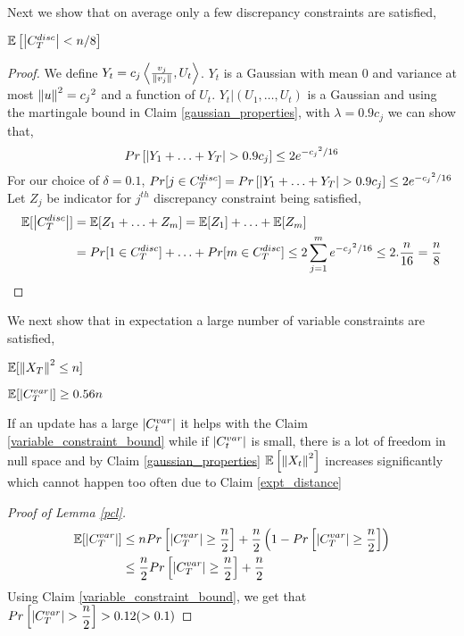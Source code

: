 Next we show that on average only a few discrepancy constraints are satisfied,
\begin{Claim}
$\mathbb{E}\left[\left\lvert C_T^{disc} \right\rvert < n/8 \right]$
\end{Claim}
\begin{proof}
We define $Y_t = c_j\left\langle \frac{v_j}{\left\lVert v_j \right\rVert},U_t\right\rangle$. $Y_t$ is a Gaussian with mean 0 and variance at most $\left\lVert u \right\rVert^2 = {c_j}^2$ and a function of $U_t$.
$Y_t|(U_1,\hdots,U_t)$ is a Gaussian and using the martingale bound in Claim \ref{gaussian_properties},  with $\lambda = 0.9c_j$ we can show that,
\[Pr\left[ \left\lvert Y_1+\hdots+Y_T \right\rvert > 0.9c_j \right] \leq 2e^{{-c_j}^2/16}\]
For our choice of $\delta = 0.1$, $Pr[j \in C_T^{disc}] = Pr\left[ \left\lvert Y_1+\hdots+Y_T \right\rvert > 0.9c_j \right] \leq 2e^{{-c_j}^2/16}$
Let $Z_j$ be indicator for $j^{th}$ discrepancy constraint being satisfied,
\begin{align*}
    \mathbb{E}[\left\lvert C_T^{disc} \right\rvert] 
    &= \mathbb{E}[Z_1+\hdots+Z_m]
    = \mathbb{E}[Z_1] + \hdots + \mathbb{E}[Z_m]\\
    &= Pr[1 \in C_T^{disc}] + \hdots + Pr[m \in C_T^{disc}]
    \leq 2\sum_{j=1}^{m}{e^{{-c_j}^2/16}} \leq 2.\dfrac{n}{16} = \dfrac{n}{8}
\end{align*}
\end{proof}
We next show that in expectation a large number of variable constraints are satisfied,
\begin{Claim} \label{expt_distance}
$\mathbb{E}[\left\lVert X_T \right\rVert^2 \leq n]$
\end{Claim}
\begin{Claim} \label{variable_constraint_bound}
$\mathbb{E}[\left\lvert C_T^{var} \right\rvert] \geq 0.56n$
\end{Claim}
If an update has a large $\left\lvert C_t^{var} \right\rvert$ it helps with the Claim \ref{variable_constraint_bound} while if $\left\lvert C_t^{var} \right\rvert$ is small, there is a lot of freedom in null space and by Claim \ref{gaussian_properties} $\operatorname{\mathbb{E}}\left[\left\lVert X_t \right\rVert^2\right]$ increases significantly which cannot happen too often due to Claim \ref{expt_distance}
\begin{proof}[Proof of Lemma \ref{pcl}]
\begin{align*}
  \mathbb{E}[\left\lvert C_T^{var} \right\rvert] 
&\leq nPr\left[\left\lvert C_T^{var} \right\rvert \geq \dfrac{n}{2}\right] + \dfrac{n}{2}\left(1- Pr\left[\left\lvert C_T^{var} \right\rvert \geq \dfrac{n}{2}\right] \right )\\
&\leq \dfrac{n}{2}Pr\left[\left\lvert C_T^{var} \right\rvert \geq \dfrac{n}{2}\right]  + \dfrac{n}{2}
\end{align*}
Using Claim \ref{variable_constraint_bound}, we get that $Pr\left[\left\lvert C_T^{var} \right\rvert > \dfrac{n}{2}\right] > 0.12 (> 0.1)$
\end{proof}
